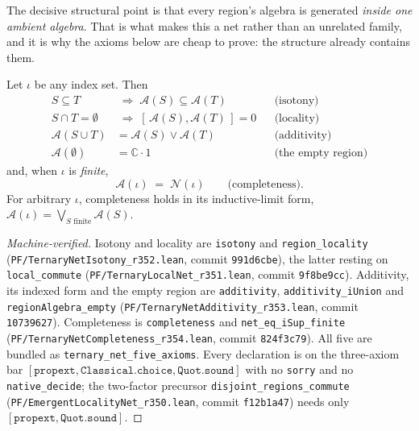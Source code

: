The decisive structural point is that every region's algebra is generated
\emph{inside one ambient algebra}. That is what makes this a net rather than an
unrelated family, and it is why the axioms below are cheap to prove: the
structure already contains them.

\begin{thm}
\label{thm:ternary-net-axioms}
Let $\iota$ be any index set. Then
\begin{align}
S \subseteq T &\;\Longrightarrow\; \mathcal{A}(S) \subseteq \mathcal{A}(T)
  &&\text{(isotony)} \\
S \cap T = \emptyset &\;\Longrightarrow\; [\,\mathcal{A}(S), \mathcal{A}(T)\,] = 0
  &&\text{(locality)} \\
\mathcal{A}(S \cup T) &= \mathcal{A}(S) \vee \mathcal{A}(T)
  &&\text{(additivity)} \\
\mathcal{A}(\emptyset) &= \mathbb{C}\cdot 1
  &&\text{(the empty region)}
\end{align}
and, when $\iota$ is \emph{finite},
\begin{equation}
\mathcal{A}(\iota) \;=\; \mathcal{N}(\iota)
\qquad\text{(completeness).}
\end{equation}
For arbitrary $\iota$, completeness holds in its inductive-limit form,
$\mathcal{A}(\iota) = \bigvee_{S \text{ finite}} \mathcal{A}(S)$.
\end{thm}

\begin{proof}[Machine-verified]
Isotony and locality are \texttt{isotony} and \texttt{region\_locality}
(\texttt{PF/TernaryNetIsotony\_r352.lean}, commit \texttt{991d6cbe}), the latter
resting on \texttt{local\_commute} (\texttt{PF/TernaryLocalNet\_r351.lean},
commit \texttt{9f8be9cc}). Additivity, its indexed form and the empty region are
\texttt{additivity}, \texttt{additivity\_iUnion} and
\texttt{regionAlgebra\_empty} (\texttt{PF/TernaryNetAdditivity\_r353.lean},
commit \texttt{10739627}). Completeness is \texttt{completeness} and
\texttt{net\_eq\_iSup\_finite} (\texttt{PF/TernaryNetCompleteness\_r354.lean},
commit \texttt{824f3c79}). All five are bundled as
\texttt{ternary\_net\_five\_axioms}. Every declaration is on the three-axiom bar
$[\texttt{propext}, \texttt{Classical.choice}, \texttt{Quot.sound}]$ with no
\texttt{sorry} and no \texttt{native\_decide}; the two-factor precursor
\texttt{disjoint\_regions\_commute}
(\texttt{PF/EmergentLocalityNet\_r350.lean}, commit \texttt{f12b1a47}) needs only
$[\texttt{propext}, \texttt{Quot.sound}]$.
\end{proof}

